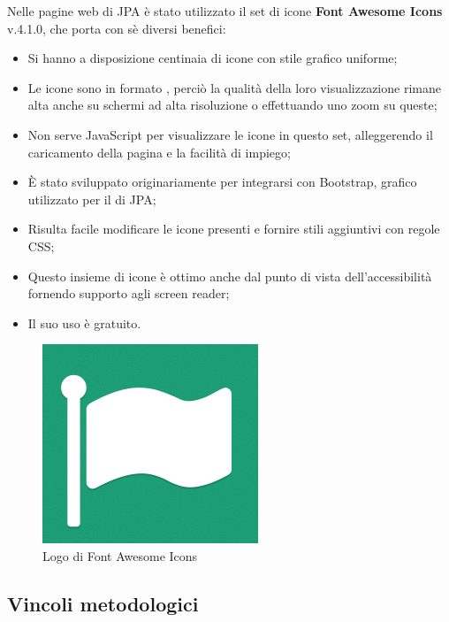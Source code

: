 Nelle pagine web di JPA è stato utilizzato il set di icone \textbf{Font
Awesome Icons} v.4.1.0, che porta con sè diversi benefici:

\begin{itemize}
\item Si hanno a disposizione centinaia di icone con stile grafico uniforme;
\item Le icone sono in formato , perciò la qualità della loro
  visualizzazione rimane alta anche su schermi ad alta risoluzione o
  effettuando uno zoom su queste;
\item Non serve JavaScript per visualizzare le icone in questo set,
  alleggerendo il caricamento della pagina e la facilità di impiego;
\item È stato sviluppato originariamente per integrarsi con Bootstrap,
   grafico utilizzato per il \FREND{} di JPA;
\item Risulta facile modificare le icone presenti e fornire stili aggiuntivi
  con regole CSS;
\item Questo insieme di icone è ottimo anche dal punto di vista
  dell'accessibilità fornendo supporto agli screen reader;
\item Il suo uso è gratuito.
\end{itemize}

\begin{figure}[H]%
\centering
\includegraphics[width=.5\columnwidth]{immagini/logo-fa}
\caption{Logo di Font Awesome Icons}%
\label{fig:logo-fa}%
\end{figure}

\subsection{Vincoli metodologici}

